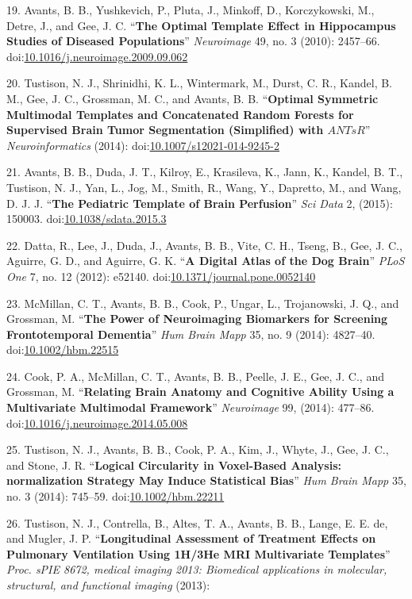 \documentclass[11pt,]{article}
\begin{document}
19. Avants, B. B., Yushkevich, P., Pluta, J., Minkoff, D., Korczykowski,
M., Detre, J., and Gee, J. C. ``\textbf{The Optimal Template Effect in
Hippocampus Studies of Diseased Populations}'' \emph{Neuroimage} 49, no.
3 (2010): 2457--66.
doi:\href{http://dx.doi.org/10.1016/j.neuroimage.2009.09.062}{10.1016/j.neuroimage.2009.09.062}

20. Tustison, N. J., Shrinidhi, K. L., Wintermark, M., Durst, C. R.,
Kandel, B. M., Gee, J. C., Grossman, M. C., and Avants, B. B.
``\textbf{Optimal Symmetric Multimodal Templates and Concatenated Random
Forests for Supervised Brain Tumor Segmentation (Simplified) with
$ANTsR$}'' \emph{Neuroinformatics} (2014):
doi:\href{http://dx.doi.org/10.1007/s12021-014-9245-2}{10.1007/s12021-014-9245-2}

21. Avants, B. B., Duda, J. T., Kilroy, E., Krasileva, K., Jann, K.,
Kandel, B. T., Tustison, N. J., Yan, L., Jog, M., Smith, R., Wang, Y.,
Dapretto, M., and Wang, D. J. J. ``\textbf{The Pediatric Template of
Brain Perfusion}'' \emph{Sci Data} 2, (2015): 150003.
doi:\href{http://dx.doi.org/10.1038/sdata.2015.3}{10.1038/sdata.2015.3}

22. Datta, R., Lee, J., Duda, J., Avants, B. B., Vite, C. H., Tseng, B.,
Gee, J. C., Aguirre, G. D., and Aguirre, G. K. ``\textbf{A Digital Atlas
of the Dog Brain}'' \emph{PLoS One} 7, no. 12 (2012): e52140.
doi:\href{http://dx.doi.org/10.1371/journal.pone.0052140}{10.1371/journal.pone.0052140}

23. McMillan, C. T., Avants, B. B., Cook, P., Ungar, L., Trojanowski, J.
Q., and Grossman, M. ``\textbf{The Power of Neuroimaging Biomarkers for
Screening Frontotemporal Dementia}'' \emph{Hum Brain Mapp} 35, no. 9
(2014): 4827--40.
doi:\href{http://dx.doi.org/10.1002/hbm.22515}{10.1002/hbm.22515}

24. Cook, P. A., McMillan, C. T., Avants, B. B., Peelle, J. E., Gee, J.
C., and Grossman, M. ``\textbf{Relating Brain Anatomy and Cognitive
Ability Using a Multivariate Multimodal Framework}'' \emph{Neuroimage}
99, (2014): 477--86.
doi:\href{http://dx.doi.org/10.1016/j.neuroimage.2014.05.008}{10.1016/j.neuroimage.2014.05.008}

25. Tustison, N. J., Avants, B. B., Cook, P. A., Kim, J., Whyte, J.,
Gee, J. C., and Stone, J. R. ``\textbf{Logical Circularity in
Voxel-Based Analysis: normalization Strategy May Induce Statistical
Bias}'' \emph{Hum Brain Mapp} 35, no. 3 (2014): 745--59.
doi:\href{http://dx.doi.org/10.1002/hbm.22211}{10.1002/hbm.22211}

26. Tustison, N. J., Contrella, B., Altes, T. A., Avants, B. B., Lange,
E. E. de, and Mugler, J. P. ``\textbf{Longitudinal Assessment of
Treatment Effects on Pulmonary Ventilation Using 1H/3He MRI Multivariate
Templates}'' \emph{Proc. sPIE 8672, medical imaging 2013: Biomedical
applications in molecular, structural, and functional imaging} (2013):
\end{document}

